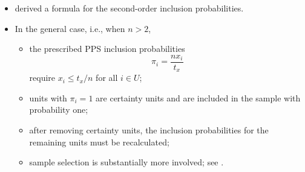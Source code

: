 \documentclass{my_eth_beamer}
\numberwithin{equation}{section}
\begin{document}
\begin{frame}
    \begin{itemize}
    \setlength{\itemsep}{8pt}
        \item \citet{brewer_1963} derived a formula for the
            \alert{second-order inclusion probabilities}.
        \item In the \alert{general case}, i.e., when $n>2$,
            \vspace{0.25em}
            \begin{itemize}
            \setlength{\itemsep}{6pt}
                \item the prescribed PPS inclusion probabilities
                    \begin{equation*}
                        \pi_i = \frac{n x_i}{t_x}
                    \end{equation*}
                    require $x_i\le t_x/n$ for all $i\in U$;
                \item units with $\pi_i=1$ are \alert{certainty units} and are
                    included in the sample with probability one;
                \item after removing certainty units, the inclusion
                    probabilities for the remaining units must be recalculated;
                \item sample selection is substantially more \alert{involved};
                    see \citet{brewer_1975}.
            \end{itemize}
    \end{itemize}
\end{frame}
\end{document}
